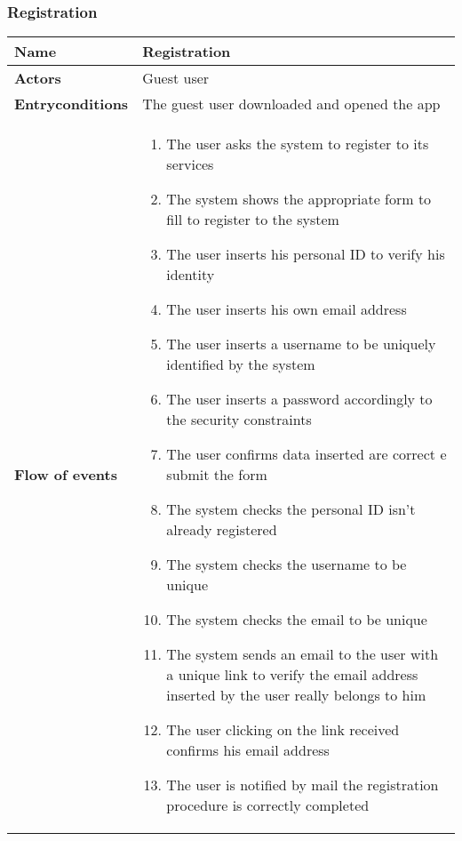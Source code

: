 \subsubsection{Registration}
\begin{longtable}{p{0.25\linewidth}p{0.75\linewidth}}
\toprule
\textbf{Name} & \textbf{Registration} \\
\midrule
\textbf{Actors} & Guest user \\
\midrule
\textbf{Entry\newline conditions} &  The guest user downloaded and opened the app\\
\midrule
\textbf{Flow of events} & 
\begin{enumerate}
	\item The user asks the system to register to its services
	\item The system shows the appropriate form to fill to register to the system
	\item The user inserts his personal ID to verify his identity
	\item The user inserts his own email address
	\item The user inserts a username to be uniquely identified by the system
	\item The user inserts a password accordingly to the security constraints
	\item The user confirms data inserted are correct e submit the form
	\item The system checks the personal ID isn't already registered
	\item The system checks the username to be unique
	\item The system checks the email to be unique
	\item The system sends an email to the user with a unique link to verify the email address inserted by the user really belongs to him
	\item The user clicking on the link received confirms his email address
	\item The user is notified by mail the registration procedure is correctly completed
\end{enumerate} \\

\midrule


\end{longtable}
